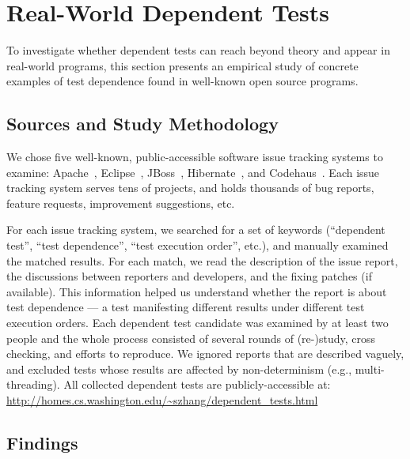 \section{Real-World Dependent Tests}
\label{sec:study}

To investigate whether dependent tests can reach beyond theory
and appear in real-world programs, this section presents an empirical
study of concrete examples of test dependence found in
well-known open source programs. 


\subsection{Sources and Study Methodology}

We chose five well-known, public-accessible software issue
tracking systems to examine: Apache~\cite{apachebug},
Eclipse~\cite{eclipsebug}, JBoss~\cite{jbossbug},
Hibernate~\cite{hibernatebug}, and Codehaus~\cite{codehausbug}.
Each issue tracking system serves tens of projects, and
holds thousands of bug reports, feature requests, improvement
suggestions, etc.

For each issue tracking system, we searched for a set of keywords
(``dependent test'', ``test dependence'', ``test execution order'',
etc.), and manually examined the matched results. For each match, we read the
description of the issue report, the discussions between reporters
and developers, and the fixing patches (if available). This information
helped us understand whether the report is about test dependence
--- a test manifesting different results under different
test execution orders. Each dependent test candidate was examined by
at least two people and the whole process consisted of several
rounds of (re-)study, cross checking, and efforts to reproduce. We ignored reports
that are described vaguely, and excluded tests whose results are
affected by non-determinism (e.g., multi-threading).
All collected dependent tests are publicly-accessible
at: \url{http://homes.cs.washington.edu/~szhang/dependent\_tests.html}


\subsection{Findings}

